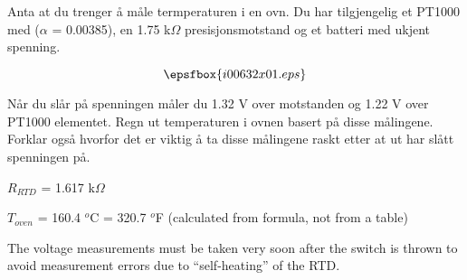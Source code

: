 


Anta at du trenger {\aa} m{\aa}le termperaturen i en ovn. Du har tilgjengelig et PT1000 med ($\alpha$ = 0.00385), en 1.75 k$\Omega$ presisjonsmotstand og et batteri med ukjent spenning. 

$$\epsfbox{i00632x01.eps}$$


N{\aa}r du sl{\aa}r p{\aa} spenningen m{\aa}ler du 1.32 V over motstanden og 1.22 V over PT1000 elementet. Regn ut temperaturen i ovnen basert p{\aa} disse m{\aa}lingene. Forklar ogs{\aa} hvorfor det er viktig {\aa} ta disse m{\aa}lingene raskt etter at ut har sl{\aa}tt spenningen p{\aa}. 







$R_{RTD}$ = 1.617 k$\Omega$

\vskip 10pt

$T_{oven}$ = 160.4 $^{o}$C = 320.7 $^{o}$F (calculated from formula, not from a table)

\vskip 10pt

The voltage measurements must be taken very soon after the switch is thrown to avoid measurement errors due to ``self-heating'' of the RTD.










